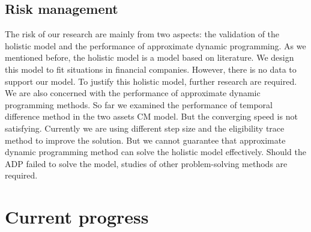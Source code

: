 \documentclass[12pt]{article}
\begin{document}
\subsection{Risk management}
The risk of our research are mainly from two aspects: the validation of the holistic model and the performance of approximate dynamic programming. As we mentioned before, the holistic model is a model based on literature. We design this model to fit situations in financial companies. However, there is no data to support our model. To justify this holistic model, further research are required. We are also concerned with the performance of approximate dynamic programming methods. So far we examined the performance of temporal difference method in the two assets CM model. But the converging speed is not satisfying. Currently we are using different step size and the eligibility trace method to improve the solution. But we cannot guarantee that approximate dynamic programming method can solve the holistic model effectively. Should the ADP failed to solve the model, studies of other problem-solving methods are required.


\section{Current progress}
\end{document}
